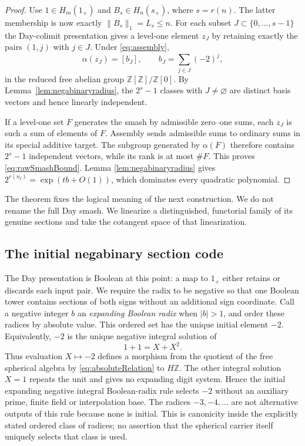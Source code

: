 \documentclass[11pt]{amsart}
\theoremstyle{definition}
\theoremstyle{remark}
\newcommand{\Z}{\mathbb Z}
\begin{document}
\begin{proof}
Use $1\in H_m(1_+)$ and $B_s\in H_n(s_+)$, where $s=r(n)$.  The latter
membership is now exactly $\|B_s\|_1=L_s\leq n$.  For each
subset $J\subset\{0,\ldots,s-1\}$ the Day-colimit presentation gives a
level-one element $z_J$ by retaining exactly the pairs $(1,j)$ with
$j\in J$.  Under \eqref{eq:assembly},
\[
 \alpha(z_J)=[b_J],\qquad b_J=\sum_{j\in J}(-2)^j,
\]
in the reduced free abelian group
$\Z[\Z]/\Z[0]$.  By Lemma~\ref{lem:negabinaryradius}, the $2^s-1$ classes
with $J\neq\varnothing$ are distinct basis vectors and hence linearly
independent.

If a level-one set $F$ generates the smash by admissible zero--one sums,
each $z_J$ is such a sum of elements of $F$.  Assembly sends admissible sums
to ordinary sums in its special additive target.  The subgroup generated by
$\alpha(F)$ therefore contains $2^s-1$ independent vectors, while its rank
is at most $\#F$.  This proves \eqref{eq:rawSmashBound}.  Lemma
\ref{lem:negabinaryradius} gives
$2^{r(n_t)}=\exp(tb+O(1))$, which dominates every quadratic polynomial.
\end{proof}

The theorem fixes the logical meaning of the next construction.  We do not
rename the full Day smash.  We linearize a distinguished, functorial family
of its genuine sections and take the cotangent space of that linearization.

\subsection{The initial negabinary section code}

The Day presentation is Boolean at this point: a map to $1_+$ either retains
or discards each input pair.  We require the radix to be negative so that
one Boolean tower contains sections of both signs without an additional
sign coordinate.  Call a negative integer $b$ an
\emph{expanding Boolean radix} when $|b|>1$, and order these radices by
absolute value.  This ordered set has the unique initial element $-2$.
Equivalently, $-2$ is the unique negative integral solution of
\begin{equation}\label{eq:absoluteRelation}
 1+1=X+X^2.
\end{equation}
Thus evaluation $X\mapsto-2$ defines a morphism from the quotient of the
free spherical algebra by \eqref{eq:absoluteRelation} to $H\Z$.  The other
integral solution $X=1$ repeats the unit and gives no expanding digit
system.  Hence the initial expanding negative integral Boolean-radix rule
selects $-2$
without an auxiliary prime, finite field or interpolation base.  The
radices $-3,-4,\ldots$ are not alternative outputs of this rule because
none is initial.  This is canonicity inside the explicitly stated ordered
class of radices; no assertion that the spherical carrier itself uniquely
selects that class is used.
\end{document}
